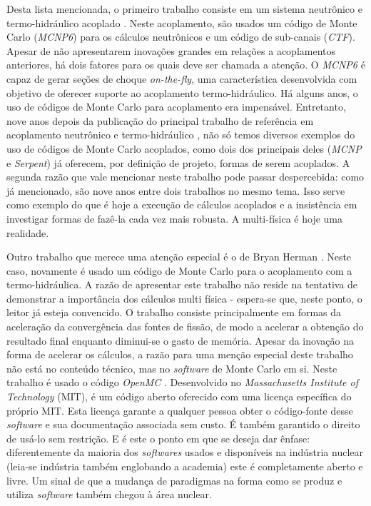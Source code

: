 Desta lista mencionada, o primeiro trabalho consiste em um sistema neutrônico e termo-hidráulico
acoplado \cite{Bennett2016}. Neste acoplamento, são usados um código
de Monte Carlo (\textit{MCNP6}) para os cálculos neutrônicos e um código de sub-canais (\textit{CTF}). Apesar de não apresentarem
inovações grandes em relações a acoplamentos anteriores, há dois fatores para os quais deve ser chamada a atenção.
O \textit{MCNP6} é capaz de gerar seções de choque \textit{on-the-fly}, uma característica desenvolvida com objetivo
de oferecer suporte ao acoplamento termo-hidráulico. Há alguns anos, o uso de códigos de Monte Carlo para
acoplamento era impensável. Entretanto, nove anos depois da publicação do principal trabalho
de referência em acoplamento neutrônico e termo-hidráulico \cite{Ivanov2007}, não só temos
diversos exemplos do uso de códigos de Monte Carlo acoplados, como dois dos principais deles (\textit{MCNP} e \textit{Serpent})
já oferecem, por definição de projeto, formas de serem acoplados. A segunda razão que vale mencionar neste
trabalho pode passar despercebida: como já mencionado, são nove anos entre dois trabalhos no mesmo tema.
Isso serve como exemplo do que é hoje a execução de cálculos acoplados e a insistência em
investigar formas de fazê-la cada vez mais robusta. A multi-física é hoje uma realidade.

Outro trabalho que merece uma atenção especial é o de Bryan Herman \cite{Herman2015}. Neste caso, novamente
é usado um código de Monte Carlo para o acoplamento com a termo-hidráulica. A razão de apresentar este trabalho
não reside na tentativa de demonstrar a importância dos cálculos multi física - espera-se que, neste ponto,
o leitor já esteja convencido. O trabalho consiste principalmente em formas da aceleração da
convergência das fontes de fissão, de modo a acelerar a obtenção do resultado final enquanto
diminui-se o gasto de memória. Apesar da inovação na forma de acelerar os cálculos, a razão para uma menção
especial deste trabalho não está no conteúdo técnico, mas no \textit{software} de Monte Carlo em si.
Neste trabalho é usado o código \textit{OpenMC} \cite{Romano2013}. Desenvolvido no \textit{Massachusetts
  Institute of Technology} (MIT), é um código aberto oferecido com uma licença específica do próprio MIT.
Esta licença garante a qualquer pessoa obter o código-fonte desse \textit{software} e sua
documentação associada sem custo. É também garantido o direito de usá-lo sem restrição.
E é este o ponto em que se deseja dar ênfase: diferentemente da maioria
dos \textit{softwares} usados e disponíveis na indústria nuclear (leia-se indústria também englobando a academia)
este é completamente aberto e livre. Um sinal de que a mudança de paradigmas na
forma como se produz e utiliza \textit{software} também chegou à área nuclear.


